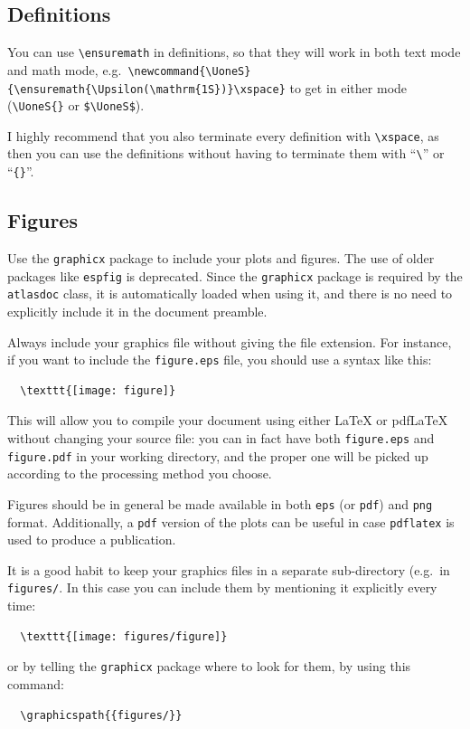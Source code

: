 \documentclass[atlasstyle,UKenglish]{latex/atlasdoc}
\newcommand{\File}[1]{\texttt{#1}\xspace}
\newcommand{\Macro}[1]{\texttt{\textbackslash #1}\xspace}
\newcommand{\Package}[1]{\texttt{#1}\xspace}
\begin{document}
\subsection{Definitions}

You can use \verb|\ensuremath| in definitions, so that they will work
in both text mode and math mode, e.g.\
\verb|\newcommand{\UoneS}{\ensuremath{\Upsilon(\mathrm{1S})}\xspace}| to get
\UoneS{} in either mode (\verb|\UoneS{}| or \verb|$\UoneS$|).

I highly recommend that you also terminate every definition with \Macro{xspace},
as then you can use the definitions without having to terminate them with
``\verb|\|'' or ``\verb|{}|''.


\subsection{Figures}

Use the \Package{graphicx} package to include your plots and figures. 
The use of older packages like \Package{espfig} is deprecated.
Since the \Package{graphicx} package is required by the \Package{atlasdoc}
class, it is automatically loaded when using it, and there is no need
to explicitly include it in the document preamble.

Always include your graphics file without giving the file extension.
For instance, if you want to include the \File{figure.eps}
file, you should use a syntax like this:
\begin{verbatim}
  \texttt{[image: figure]}
\end{verbatim}
This will allow you to compile your document using either \LaTeX{} or
pdf\LaTeX{} without changing your source file: you can in fact have
both \File{figure.eps} and \File{figure.pdf} in your working directory,
and the proper one will be picked up according to the processing method
you choose.

Figures should be in general be made available in both \texttt{eps} (or \texttt{pdf}) and 
\texttt{png} format. Additionally, a \texttt{pdf} version of the plots can be
useful in case \verb|pdflatex| is used to produce a publication.

It is a good habit to keep your graphics files in a separate
sub-directory (e.g.\ in \File{figures/}. 
In this case you can include them by mentioning it explicitly every time:
\begin{verbatim}
  \texttt{[image: figures/figure]}
\end{verbatim}
or by telling the \Package{graphicx} package where to look
for them, by using this command:
\begin{verbatim}
  \graphicspath{{figures/}}
\end{verbatim}
\end{document}
